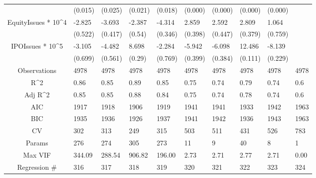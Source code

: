 \documentclass{article}
\begin{document}
\begin{table}[H]
\begin{tabular}{|clllllllll|}
   & (0.015) & (0.025) & (0.021) & (0.018) & (0.000) & (0.000) & (0.000) & (0.000) &  \\ 
  EquityIssues * 10^4 & -2.825 & -3.693 & -2.387 & -4.314 & 2.859 & 2.592 & 2.809 & 1.064 &  \\ 
   & (0.522) & (0.417) & (0.54) & (0.346) & (0.398) & (0.447) & (0.379) & (0.759) &  \\ 
  IPOIssues * 10^5 & -3.105 & -4.482 & 8.698 & -2.284 & -5.942 & -6.098 & 12.486 & -8.139 &  \\ 
   & (0.699) & (0.561) & (0.29) & (0.769) & (0.399) & (0.384) & (0.111) & (0.229) &  \\ 
  \hline 
 Observations & 4978 & 4978 & 4978 & 4978 & 4978 & 4978 & 4978 & 4978 & 4978 \\ 
  R^2 & 0.86 & 0.85 & 0.89 & 0.85 & 0.75 & 0.74 & 0.79 & 0.74 & 0.6 \\ 
  Adj R^2 & 0.85 & 0.85 & 0.88 & 0.84 & 0.75 & 0.74 & 0.78 & 0.74 & 0.6 \\ 
  AIC & 1917 & 1918 & 1906 & 1919 & 1941 & 1941 & 1933 & 1942 & 1963 \\ 
  BIC & 1935 & 1936 & 1926 & 1937 & 1941 & 1942 & 1936 & 1943 & 1963 \\ 
  CV & 302 & 313 & 249 & 315 & 503 & 511 & 431 & 526 & 783 \\ 
  Params & 276 & 274 & 305 & 273 & 11 & 9 & 40 & 8 & 1 \\ 
  Max VIF & 344.09 & 288.54 & 906.82 & 196.00 & 2.73 & 2.71 & 2.77 & 2.71 & 0.00 \\ 
  Regression \# & 316 & 317 & 318 & 319 & 320 & 321 & 322 & 323 & 324 \\ 
   \hline
\end{tabular}
 
\end{table}
\end{document}
